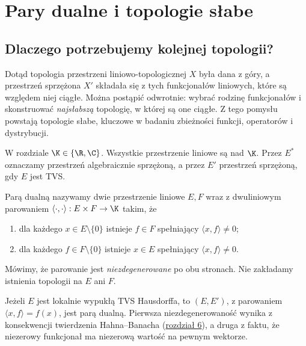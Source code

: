 \setcounter{section}{7}
\section{Pary dualne i topologie słabe}\label{sec:topologie-slabe}

\providecommand{\atlasref}[2]{#2}


\subsection{Dlaczego potrzebujemy kolejnej topologii?}

Dotąd topologia przestrzeni liniowo-topologicznej $X$ była dana z góry,
a przestrzeń sprzężona $X'$ składała się z tych
funkcjonałów liniowych, które są względem niej ciągłe.
Można postąpić odwrotnie: wybrać rodzinę funkcjonałów i skonstruować
\emph{najsłabszą} topologię, w której są one ciągłe.
Z tego pomysłu powstają topologie słabe, kluczowe w badaniu zbieżności
funkcji, operatorów i dystrybucji.

W rozdziale $\K\in\{\R,\C\}$. Wszystkie przestrzenie liniowe
są nad $\K$. Przez $E^*$ oznaczamy przestrzeń algebraicznie
sprzężoną, a przez $E'$ przestrzeń sprzężoną, gdy $E$ jest TVS.

\begin{definicja}\label{def:para-dualna}
Parą dualną nazywamy dwie przestrzenie liniowe $E,F$ wraz
z dwuliniowym parowaniem $\langle\cdot,\cdot\rangle:E\times F\to\K$
takim, że
\begin{enumerate}
\item dla każdego $x\in E\setminus\{0\}$ istnieje $f\in F$
      spełniający $\langle x,f\rangle\ne0$;
\item dla każdego $f\in F\setminus\{0\}$ istnieje $x\in E$
      spełniający $\langle x,f\rangle\ne0$.
\end{enumerate}
Mówimy, że parowanie jest \emph{niezdegenerowane} po obu stronach.
Nie zakładamy istnienia topologii na $E$ ani $F$.
\end{definicja}

\begin{przyklad}
Jeżeli $E$ jest lokalnie wypukłą TVS Hausdorffa, to
$(E,E')$, z parowaniem $\langle x,f\rangle=f(x)$,
jest parą dualną. Pierwsza niezdegenerowaność wynika
z konsekwencji twierdzenia Hahna--Banacha (\hyperref[sec:hahn-banach]{rozdział 6}),
a druga z faktu, że niezerowy funkcjonał ma niezerową wartość
na pewnym wektorze.
\end{przyklad}

